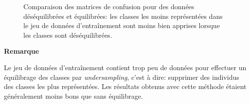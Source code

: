 \begin{figure}
    \centering
    \qquad
    \caption{Comparaison des matrices de confusion pour des données déséquilibrées et équilibrées: les classes les moins représentées dans le jeu de données d'entraînement sont moins bien apprises lorsque les classes sont déséquilibrées.}
    \label{confusion}
\end{figure}

\noindent
\begin{minipage}[!hc]{0.12\textwidth}
   \textbf{Remarque}
\end{minipage}
\vrule\enskip\vrule\quad\begin{minipage}{\dimexpr 0.87\textwidth-0.8pt-1.5em}
Le jeu de données d'entraînement contient trop peu de données pour effectuer un équilibrage des classes par \textit{undersampling}, c'est à dire: supprimer des individus des classes les plus représentées. Les résultats obtenus avec cette méthode étaient généralement moins bons que sans équilibrage.
\end{minipage}